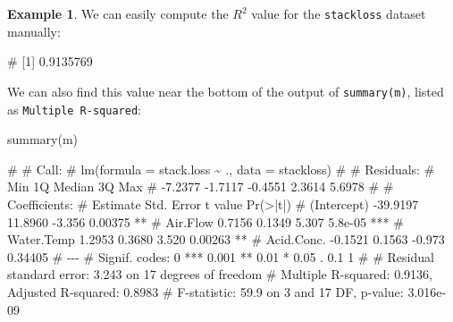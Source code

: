 \documentclass[
  a4paper,
]{article}
\newenvironment{Shaded}{\begin{snugshade}}{\end{snugshade}}
\newcommand{\AttributeTok}[1]{\textcolor[rgb]{0.77,0.63,0.00}{#1}}
\newcommand{\DecValTok}[1]{\textcolor[rgb]{0.00,0.00,0.81}{#1}}
\newcommand{\FunctionTok}[1]{\textcolor[rgb]{0.00,0.00,0.00}{#1}}
\newcommand{\NormalTok}[1]{#1}
\newcommand{\OtherTok}[1]{\textcolor[rgb]{0.56,0.35,0.01}{#1}}
\newcommand{\SpecialCharTok}[1]{\textcolor[rgb]{0.00,0.00,0.00}{#1}}
\theoremstyle{definition}
\theoremstyle{definition}
\newtheorem{example}{Example}[section]
\theoremstyle{definition}
\theoremstyle{definition}
\theoremstyle{remark}
\begin{document}
\begin{example}

We can easily compute the \(R^2\) value for the \texttt{stackloss} dataset
manually:

\begin{Shaded}
\end{Shaded}

\begin{Shaded}
\begin{Highlighting}[]
\NormalTok{\# [1] 0.9135769}
\end{Highlighting}
\end{Shaded}

We can also find this value near the bottom of the output of
\texttt{summary(m)}, listed as \texttt{Multiple\ R-squared}:

\begin{Shaded}
\begin{Highlighting}[]
\FunctionTok{summary}\NormalTok{(m)}
\end{Highlighting}
\end{Shaded}

\begin{Shaded}
\begin{Highlighting}[]
\NormalTok{\# }
\NormalTok{\# Call:}
\NormalTok{\# lm(formula = stack.loss \textasciitilde{} ., data = stackloss)}
\NormalTok{\# }
\NormalTok{\# Residuals:}
\NormalTok{\#     Min      1Q  Median      3Q     Max }
\NormalTok{\# {-}7.2377 {-}1.7117 {-}0.4551  2.3614  5.6978 }
\NormalTok{\# }
\NormalTok{\# Coefficients:}
\NormalTok{\#             Estimate Std. Error t value Pr(\textgreater{}|t|)    }
\NormalTok{\# (Intercept) {-}39.9197    11.8960  {-}3.356  0.00375 ** }
\NormalTok{\# Air.Flow      0.7156     0.1349   5.307  5.8e{-}05 ***}
\NormalTok{\# Water.Temp    1.2953     0.3680   3.520  0.00263 ** }
\NormalTok{\# Acid.Conc.   {-}0.1521     0.1563  {-}0.973  0.34405    }
\NormalTok{\# {-}{-}{-}}
\NormalTok{\# Signif. codes:  0 \textquotesingle{}***\textquotesingle{} 0.001 \textquotesingle{}**\textquotesingle{} 0.01 \textquotesingle{}*\textquotesingle{} 0.05 \textquotesingle{}.\textquotesingle{} 0.1 \textquotesingle{} \textquotesingle{} 1}
\NormalTok{\# }
\NormalTok{\# Residual standard error: 3.243 on 17 degrees of freedom}
\NormalTok{\# Multiple R{-}squared:  0.9136,  Adjusted R{-}squared:  0.8983 }
\NormalTok{\# F{-}statistic:  59.9 on 3 and 17 DF,  p{-}value: 3.016e{-}09}
\end{Highlighting}
\end{Shaded}

\end{example}
\end{document}

